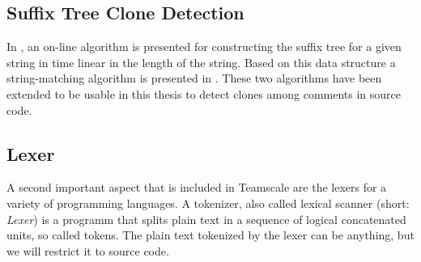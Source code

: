 \subsection{Suffix Tree Clone Detection}
In \cite{Ukkonen1995}, an on-line algorithm is presented for constructing the suffix tree for a given string in time linear in the length of the string. Based on this data structure a string-matching algorithm is presented in \cite{Ukkonen1993}. These two algorithms have been extended to be usable in this thesis to detect clones among comments in source code.
\subsection{Lexer}
A second important aspect that is included in Teamscale are the lexers for a variety of programming languages. A tokenizer, also called lexical scanner (short: \textit{Lexer}) is a programm that splits plain text in a sequence of logical concatenated units, so called tokens. The plain text tokenized by the lexer can be anything, but we will restrict it to source code.